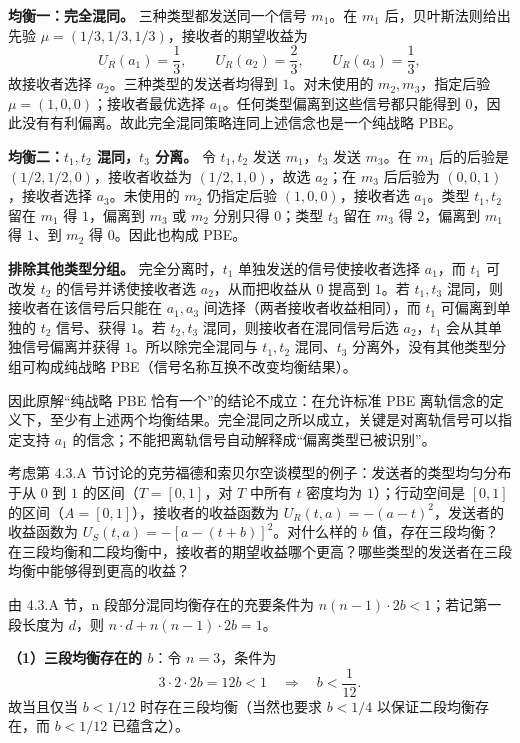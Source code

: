 \textbf{均衡一：完全混同。} 三种类型都发送同一个信号 $m_1$。在 $m_1$ 后，贝叶斯法则给出先验 $\mu=(1/3,1/3,1/3)$，接收者的期望收益为
\[
  U_R(a_1)=\frac13,\qquad U_R(a_2)=\frac23,\qquad U_R(a_3)=\frac13,
\]\indent
故接收者选择 $a_2$。三种类型的发送者均得到 $1$。对未使用的 $m_2,m_3$，指定后验 $\mu=(1,0,0)$；接收者最优选择 $a_1$。任何类型偏离到这些信号都只能得到 $0$，因此没有有利偏离。故此完全混同策略连同上述信念也是一个纯战略 PBE。

\textbf{均衡二：$t_1,t_2$ 混同，$t_3$ 分离。} 令 $t_1,t_2$ 发送 $m_1$，$t_3$ 发送 $m_3$。在 $m_1$ 后的后验是 $(1/2,1/2,0)$，接收者收益为 $(1/2,1,0)$，故选 $a_2$；在 $m_3$ 后后验为 $(0,0,1)$，接收者选择 $a_3$。未使用的 $m_2$ 仍指定后验 $(1,0,0)$，接收者选 $a_1$。类型 $t_1,t_2$ 留在 $m_1$ 得 $1$，偏离到 $m_3$ 或 $m_2$ 分别只得 $0$；类型 $t_3$ 留在 $m_3$ 得 $2$，偏离到 $m_1$ 得 $1$、到 $m_2$ 得 $0$。因此也构成 PBE。

\textbf{排除其他类型分组。} 完全分离时，$t_1$ 单独发送的信号使接收者选择 $a_1$，而 $t_1$ 可改发 $t_2$ 的信号并诱使接收者选 $a_2$，从而把收益从 $0$ 提高到 $1$。若 $t_1,t_3$ 混同，则接收者在该信号后只能在 $a_1,a_3$ 间选择（两者接收者收益相同），而 $t_1$ 可偏离到单独的 $t_2$ 信号、获得 $1$。若 $t_2,t_3$ 混同，则接收者在混同信号后选 $a_2$，$t_1$ 会从其单独信号偏离并获得 $1$。所以除完全混同与 $t_1,t_2$ 混同、$t_3$ 分离外，没有其他类型分组可构成纯战略 PBE（信号名称互换不改变均衡结果）。

因此原解“纯战略 PBE 恰有一个”的结论不成立：在允许标准 PBE 离轨信念的定义下，至少有上述两个均衡结果。完全混同之所以成立，关键是对离轨信号可以指定支持 $a_1$ 的信念；不能把离轨信号自动解释成“偏离类型已被识别”。

考虑第 4.3.A 节讨论的克劳福德和索贝尔空谈模型的例子：发送者的类型均匀分布于从 $0$ 到 $1$ 的区间（$T=[0,1]$，对 $T$ 中所有 $t$ 密度均为 $1$）；行动空间是 $[0,1]$ 的区间（$A=[0,1]$），接收者的收益函数为 $U_R(t,a)=-(a-t)^2$，发送者的收益函数为 $U_S(t,a)=-[a-(t+b)]^2$。对什么样的 $b$ 值，存在三段均衡？在三段均衡和二段均衡中，接收者的期望收益哪个更高？哪些类型的发送者在三段均衡中能够得到更高的收益？

\sol 由 4.3.A 节，n 段部分混同均衡存在的充要条件为 $n(n-1)\cdot 2b<1$；若记第一段长度为 $d$，则 $n\cdot d+n(n-1)\cdot 2b=1$。

\textbf{（1）三段均衡存在的 $b$}：令 $n=3$，条件为
\[
  3\cdot 2\cdot 2b=12b<1 \quad\Longrightarrow\quad b<\frac1{12}.
\]\indent
故当且仅当 $b<1/12$ 时存在三段均衡（当然也要求 $b<1/4$ 以保证二段均衡存在，而 $b<1/12$ 已蕴含之）。

